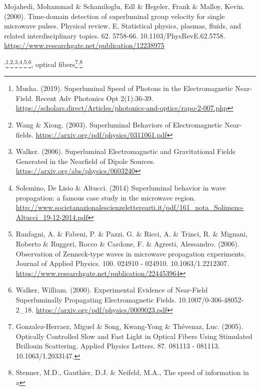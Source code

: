 \documentclass[a4paper]{article}
\newcommand\textstyleNone[1]{#1}
\begin{document}
{{Mojahedi, Mohammad \& Schamiloglu, Edl \& Hegeler, Frank \& Malloy, Kevin.
(2000). Time-domain detection of superluminal group velocity for single
microwave pulses. Physical review. E, Statistical physics, plasmas, fluids, and
related interdisciplinary topics. 62. 5758-66. 10.1103/PhysRevE.62.5758.
\url{https://www.researchgate.net/publication/12238975} \par
}\textstyleNone{{\textsuperscript{,}}}\footnote{
Musha. (2019). Superluminal Speed of Photons in the Electromagnetic Near-Field.
Recent Adv Photonics Opt 2(1):36-39.
\url{https://scholars.direct/Articles/photonics-and-optics/rapo-2-007.php} \par
}\textstyleNone{{\textsuperscript{,}}}\footnote{
Wang \& Xiong. (2003). Superluminal Behaviors of Electromagnetic Near-fields.
\url{https://arxiv.org/pdf/physics/0311061.pdf} \par
}\textstyleNone{{\textsuperscript{,}}}\footnote{
Walker. (2006). Superluminal Electromagnetic and Gravitational Fields Generated
in the Nearfield of Dipole Sources. \url{https://arxiv.org/abs/physics/0603240}
\par
}\textstyleNone{{\textsuperscript{,}}}\footnote{
Solemino, De Lisio \& Altucci. (2014) Superluminal behavior in wave propagation:
a famous case study in the microwave region.
\url{http://www.societanazionalescienzeletterearti.it/pdf/161_nota_Solimeno-Altucci_19-12-2014.pdf}
\par
}\textstyleNone{{\textsuperscript{,}}}\footnote{
Ranfagni, A. \& Fabeni, P. \& Pazzi, G. \& Ricci, A. \& Trinci, R. \& Mignani,
Roberto \& Ruggeri, Rocco \& Cardone, F. \& Agresti, Alessandro. (2006).
Observation of Zenneck-type waves in microwave propagation experiments. Journal
of Applied Physics. 100. 024910 - 024910. 10.1063/1.2212307.
\url{https://www.researchgate.net/publication/224453964} \par
}\textstyleNone{{\textsuperscript{,}}}\footnote{
Walker, William. (2000). Experimental Evidence of Near-Field Superluminally
Propagating Electromagnetic Fields. 10.1007/0-306-48052-2\_18.
\url{https://arxiv.org/pdf/physics/0009023.pdf} \par
}{, optical
fibers}\footnote{\textstyleNone{ Gonzalez-Herraez, Miguel \& Song, Kwang-Yong \&
Th\'evenaz, Luc. (2005). Optically Controlled Slow and Fast Light in Optical
Fibers Using Stimulated Brillouin Scattering. Applied Physics Letters. 87.
081113 - 081113. 10.1063/1.2033147. }\par
}\textstyleNone{{\textsuperscript{,}}}\footnote{\textstyleNone{
Stenner, M.D., Gauthier, D.J. \& Neifeld, M.A., The speed of information in a
}}}
\end{document}
